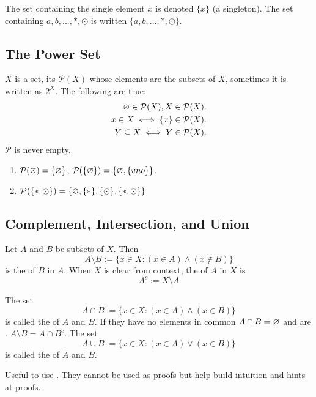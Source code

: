 The set containing the single element $x$ is denoted $\{x\}$ (a singleton). The set containing $a, b, ..., *, \odot$ is written $\{a,b,...,*,\odot\}$.

\subsection{The Power Set}
$X$ is a set, its  $\mathcal{P}(X)$ whose elements are the subsets of $X$, sometimes it is written as $2^X$. The following are true:
\begin{align}
    \varnothing \in \mathcal P(X), X \in \mathcal P(X). \\
    x \in X \iff \{x\} \in \mathcal P(X). \\
    Y \subseteq X \iff Y \in \mathcal P(X).
\end{align}
\noindent $\mathcal P$ is never empty.

\begin{example}
    \begin{enumerate}[label=(\alph*)]
        \item $\mathcal{P}(\varnothing) = \{\varnothing\}$, $\mathcal P(\{\varnothing\}) = \{\varnothing, \{vno\}\}$.
        \item $\mathcal P(\{*,\odot\}) = \{\varnothing, \{*\}, \{\odot\},\{*,\odot\}\}$
    \end{enumerate}
\end{example}

\subsection{Complement, Intersection, and Union}

Let $A$ and $B$ be subsets of $X$. Then
$$
A \setminus B := \{x \in X : (x \in A) \land (x \not\in B)\}
$$
\noindent is the  of $B$ in $A$. When $X$ is clear from context, the  of $A$ in $X$ is
$$
A^c := X \setminus A
$$

The set
$$
A \cap B := \{x \in X : (x \in A) \land (x \in B)\}
$$
\noindent is called the  of $A$ and $B$. If they have no elements in common $A \cap B = \varnothing$ and are . $A \setminus B = A \cap B^c$. The set
$$
A \cup B := \{x \in X : (x \in A) \lor (x \in B)\}
$$
\noindent is called the  of $A$ and $B$.

\begin{remark}
    Useful to use . They cannot be used as proofs but help build intuition and hints at proofs.
\end{remark}

